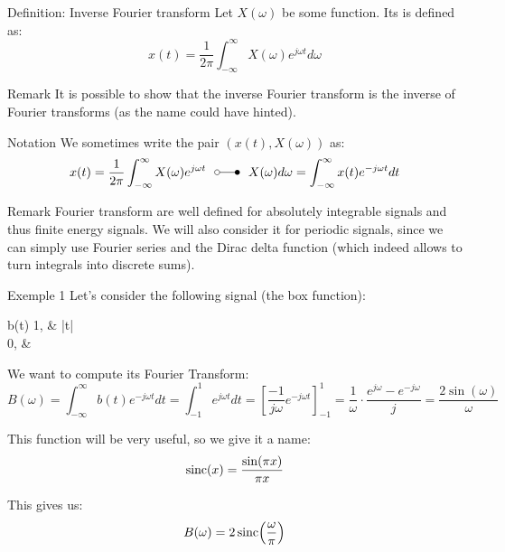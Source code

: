 \documentclass[a4paper]{article}
\begin{document}
\begin{parag}{Definition: Inverse Fourier transform}
    Let $X\left(\omega\right)$ be some function. Its  is defined as: 
    \[x\left(t\right) = \frac{1}{2 \pi} \int_{-\infty}^{\infty} X\left(\omega\right) e^{j \omega t} d\omega\]

    \begin{subparag}{Remark}
        It is possible to show that the inverse Fourier transform is the inverse of Fourier transforms (as the name could have hinted).
    \end{subparag}

    \begin{subparag}{Notation}
        We sometimes write the pair $\left(x\left(t\right), X\left(\omega\right)\right)$ as: 
        \[x\left(t\right) = \frac{1}{2\pi} \int_{-\infty}^{\infty} X\left(\omega\right)e^{j\omega t} \fourierpair X\left(\omega\right) d \omega = \int_{-\infty}^{\infty} x\left(t\right) e^{-j \omega t} dt\]
    \end{subparag}
\end{parag}

\begin{parag}{Remark}
    Fourier transform are well defined for absolutely integrable signals and thus finite energy signals. We will also consider it for periodic signals, since we can simply use Fourier series and the Dirac delta function (which indeed allows to turn integrals into discrete sums).
\end{parag}

\begin{parag}{Exemple 1}
    Let's consider the following signal (the box function):
    \begin{functionbypart}{b\left(t\right)}
        1, & \left|t\right|  \\
        0, & 
    \end{functionbypart}

    We want to compute its Fourier Transform: 
    \[B\left(\omega\right) = \int_{-\infty}^{\infty} b\left(t\right) e^{-j \omega t} dt = \int_{-1}^{1} e^{j \omega t} dt = \left[\frac{-1}{j \omega} e^{-j \omega t}\right]_{-1}^{1} = \frac{1}{\omega} \cdot  \frac{e^{j \omega} - e^{-j \omega}}{j} = \frac{2 \sin\left(\omega\right)}{\omega}\]
    
    This function will be very useful, so we give it a name: 
    \[\sinc\left(x\right) = \frac{\sin\left(\pi x\right)}{\pi x}\]


    This gives us: 
    \[B\left(\omega\right) = 2\sinc\left(\frac{\omega}{\pi}\right)\]
\end{parag}
\end{document}
